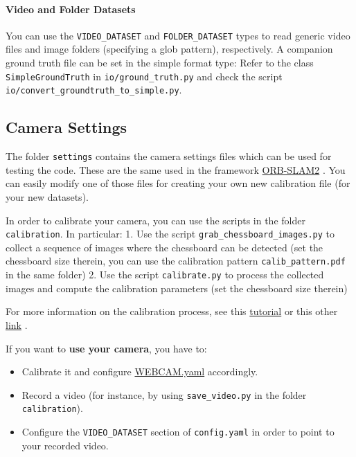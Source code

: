 \documentclass{article}
\let\oldparagraph\paragraph
\renewcommand{\paragraph}[1]{\oldparagraph{#1}\mbox{}}
\begin{document}
\hypertarget{video-and-folder-datasets}{%
\paragraph{Video and Folder Datasets}\label{video-and-folder-datasets}}

You can use the \texttt{VIDEO\_DATASET} and \texttt{FOLDER\_DATASET}
types to read generic video files and image folders (specifying a glob
pattern), respectively. A companion ground truth file can be set in the
simple format type: Refer to the class \texttt{SimpleGroundTruth} in
\texttt{io/ground\_truth.py} and check the script
\texttt{io/convert\_groundtruth\_to\_simple.py}.
\hypertarget{camera-settings}{%
\subsection{Camera Settings}\label{camera-settings}}

The folder \texttt{settings} contains the camera settings files which
can be used for testing the code. These are the same used in the
framework \href{https://github.com/raulmur/ORB_SLAM2}{ORB-SLAM2} \cite{ORB_SLAM2}. You
can easily modify one of those files for creating your own new
calibration file (for your new datasets).

In order to calibrate your camera, you can use the scripts in the folder
\texttt{calibration}. In particular: 1. Use the script
\texttt{grab\_chessboard\_images.py} to collect a sequence of images
where the chessboard can be detected (set the chessboard size therein,
you can use the calibration pattern \texttt{calib\_pattern.pdf} in the
same folder) 2. Use the script \texttt{calibrate.py} to process the
collected images and compute the calibration parameters (set the
chessboard size therein)

For more information on the calibration process, see this
\href{https://learnopencv.com/camera-calibration-using-opencv/}{tutorial} \cite{learnopencv}
or this other
\href{https://docs.opencv.org/4.x/dc/dbb/tutorial_py_calibration.html}{link} \cite{opencv}.

If you want to \textbf{use your camera}, you have to: 
\begin{itemize}
\item Calibrate it and configure \href{./settings/WEBCAM.yaml}{WEBCAM.yaml} accordingly.
\item Record a video (for instance, by using \texttt{save\_video.py} in the folder \texttt{calibration}). 
\item Configure the \texttt{VIDEO\_DATASET} section of \texttt{config.yaml} in order to point to your recorded video.
\end{itemize}
\end{document}
